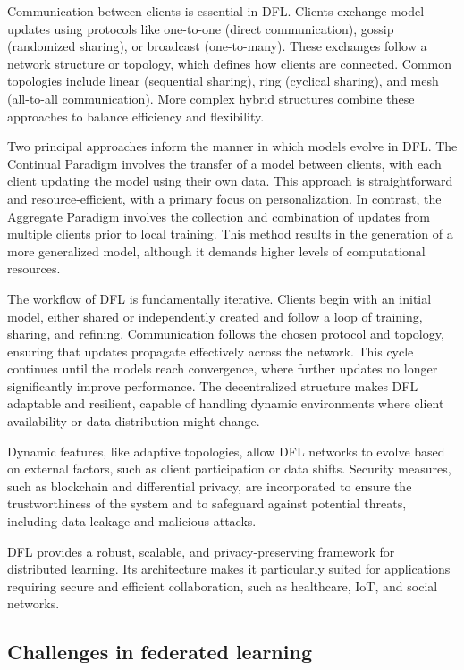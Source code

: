 Communication between clients is essential in \gls{DFL}. Clients exchange model updates using protocols like one-to-one (direct communication), gossip (randomized sharing), or broadcast (one-to-many). These exchanges follow a network structure or topology, which defines how clients are connected. Common topologies include linear (sequential sharing), ring (cyclical sharing), and mesh (all-to-all communication). More complex hybrid structures combine these approaches to balance efficiency and flexibility.

Two principal approaches inform the manner in which models evolve in DFL. The Continual Paradigm involves the transfer of a model between clients, with each client updating the model using their own data. This approach is straightforward and resource-efficient, with a primary focus on personalization. In contrast, the Aggregate Paradigm involves the collection and combination of updates from multiple clients prior to local training. This method results in the generation of a more generalized model, although it demands higher levels of computational resources.

The workflow of \gls{DFL} is fundamentally iterative. Clients begin with an initial model, either shared or independently created and follow a loop of training, sharing, and refining. Communication follows the chosen protocol and topology, ensuring that updates propagate effectively across the network. This cycle continues until the models reach convergence, where further updates no longer significantly improve performance. The decentralized structure makes \gls{DFL} adaptable and resilient, capable of handling dynamic environments where client availability or data distribution might change.

Dynamic features, like adaptive topologies, allow \gls{DFL} networks to evolve based on external factors, such as client participation or data shifts. Security measures, such as blockchain and differential privacy, are incorporated to ensure the trustworthiness of the system and to safeguard against potential threats, including data leakage and malicious attacks.

\gls{DFL} provides a robust, scalable, and privacy-preserving framework for distributed learning. Its architecture makes it particularly suited for applications requiring secure and efficient collaboration, such as healthcare, \gls{IoT}, and social networks.



\subsection{Challenges in federated learning}
\label{sub:challenges_in_fl}

